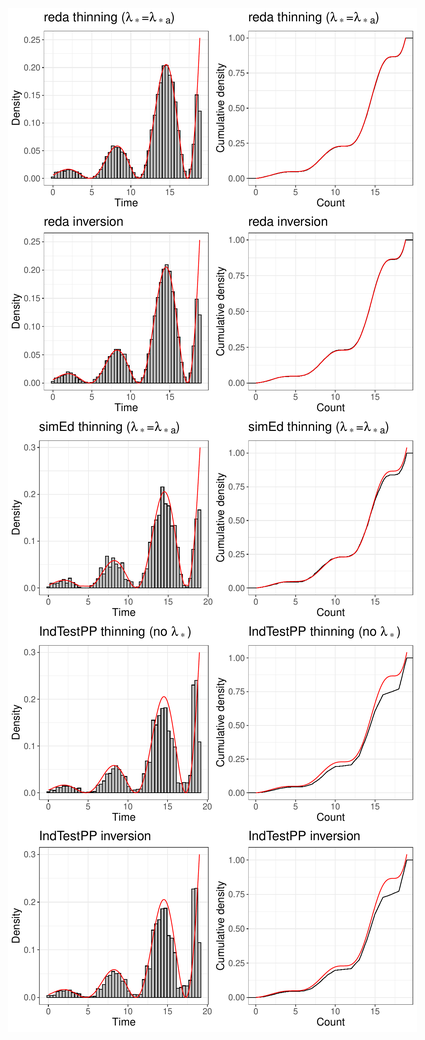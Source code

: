 \documentclass[article]{jss}\usepackage[]{graphicx}\usepackage[]{xcolor}
\makeatletter
\def\maxwidth{ %
  \ifdim\Gin@nat@width>\linewidth
    \linewidth
  \else
    \Gin@nat@width
  \fi
}
\newenvironment{knitrout}{}{} %
\makeatother
\begin{document}
\begin{knitrout}
\color{fgcolor}\begin{figure}

{\centering \includegraphics[width=\maxwidth,height=\textheight,keepaspectratio=true]{figure/epdf-r-pkgs-times-1} 

}
\end{figure}
\end{knitrout}
\end{document}
